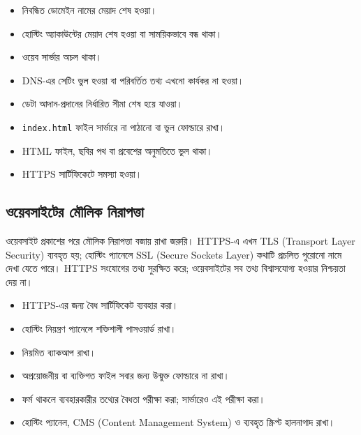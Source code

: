 \par\noindent
\begin{minipage}[t]{.48\linewidth}\vspace{0pt}
\begin{itemize}
\item নিবন্ধিত ডোমেইন নামের মেয়াদ শেষ হওয়া।
\item হোস্টিং অ্যাকাউন্টের মেয়াদ শেষ হওয়া বা সাময়িকভাবে বন্ধ থাকা।
\item ওয়েব সার্ভার অচল থাকা।
\item DNS-এর সেটিং ভুল হওয়া বা পরিবর্তিত তথ্য এখনো কার্যকর না হওয়া।
\end{itemize}
\end{minipage}\hfill
\begin{minipage}[t]{.48\linewidth}\vspace{0pt}
\begin{itemize}
\item ডেটা আদান-প্রদানের নির্ধারিত সীমা শেষ হয়ে যাওয়া।
\item \texttt{index.html} ফাইল সার্ভারে না পাঠানো বা ভুল ফোল্ডারে রাখা।
\item HTML ফাইল, ছবির পথ বা প্রবেশের অনুমতিতে ভুল থাকা।
\item HTTPS সার্টিফিকেটে সমস্যা হওয়া।
\end{itemize}
\end{minipage}\par


\subsection{ওয়েবসাইটের মৌলিক নিরাপত্তা}

ওয়েবসাইট প্রকাশের পরে মৌলিক নিরাপত্তা বজায় রাখা জরুরি। HTTPS-এ এখন TLS (Transport Layer Security) ব্যবহৃত হয়; হোস্টিং প্যানেলে SSL (Secure Sockets Layer) কথাটি প্রচলিত পুরোনো নামে দেখা যেতে পারে। HTTPS সংযোগের তথ্য সুরক্ষিত করে; ওয়েবসাইটের সব তথ্য বিশ্বাসযোগ্য হওয়ার নিশ্চয়তা দেয় না।

\par\noindent
\begin{minipage}[t]{.48\linewidth}\vspace{0pt}
\begin{itemize}
\item HTTPS-এর জন্য বৈধ সার্টিফিকেট ব্যবহার করা।
\item হোস্টিং নিয়ন্ত্রণ প্যানেলে শক্তিশালী পাসওয়ার্ড রাখা।
\item নিয়মিত ব্যাকআপ রাখা।
\end{itemize}
\end{minipage}\hfill
\begin{minipage}[t]{.48\linewidth}\vspace{0pt}
\begin{itemize}
\item অপ্রয়োজনীয় বা ব্যক্তিগত ফাইল সবার জন্য উন্মুক্ত ফোল্ডারে না রাখা।
\item ফর্ম থাকলে ব্যবহারকারীর তথ্যের বৈধতা পরীক্ষা করা; সার্ভারেও এই পরীক্ষা করা।
\item হোস্টিং প্যানেল, CMS (Content Management System) ও ব্যবহৃত স্ক্রিপ্ট হালনাগাদ রাখা।
\end{itemize}
\end{minipage}\par


